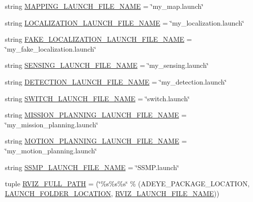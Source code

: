 \begin{DoxyCompactItemize}
\item 
string \hyperlink{namespacemanager_ad33e0681d727d6ce2212b3b1e8df8c58}{M\+A\+P\+P\+I\+N\+G\+\_\+\+L\+A\+U\+N\+C\+H\+\_\+\+F\+I\+L\+E\+\_\+\+N\+A\+ME} = \char`\"{}my\+\_\+map.\+launch\char`\"{}
\item 
string \hyperlink{namespacemanager_ac5cea2f52fdf5b97671e86476298f965}{L\+O\+C\+A\+L\+I\+Z\+A\+T\+I\+O\+N\+\_\+\+L\+A\+U\+N\+C\+H\+\_\+\+F\+I\+L\+E\+\_\+\+N\+A\+ME} = \char`\"{}my\+\_\+localization.\+launch\char`\"{}
\item 
string \hyperlink{namespacemanager_a4d3eb6177218a24979c6889f9c1908d2}{F\+A\+K\+E\+\_\+\+L\+O\+C\+A\+L\+I\+Z\+A\+T\+I\+O\+N\+\_\+\+L\+A\+U\+N\+C\+H\+\_\+\+F\+I\+L\+E\+\_\+\+N\+A\+ME} = \char`\"{}my\+\_\+fake\+\_\+localization.\+launch\char`\"{}
\item 
string \hyperlink{namespacemanager_a368d806bbf5be8e72604353b971871d5}{S\+E\+N\+S\+I\+N\+G\+\_\+\+L\+A\+U\+N\+C\+H\+\_\+\+F\+I\+L\+E\+\_\+\+N\+A\+ME} = \char`\"{}my\+\_\+sensing.\+launch\char`\"{}
\item 
string \hyperlink{namespacemanager_a1312c3fc2b915604378de82f841606b3}{D\+E\+T\+E\+C\+T\+I\+O\+N\+\_\+\+L\+A\+U\+N\+C\+H\+\_\+\+F\+I\+L\+E\+\_\+\+N\+A\+ME} = \char`\"{}my\+\_\+detection.\+launch\char`\"{}
\item 
string \hyperlink{namespacemanager_ac734eeabc7266313bdf84d100e8c5d77}{S\+W\+I\+T\+C\+H\+\_\+\+L\+A\+U\+N\+C\+H\+\_\+\+F\+I\+L\+E\+\_\+\+N\+A\+ME} = \char`\"{}switch.\+launch\char`\"{}
\item 
string \hyperlink{namespacemanager_ab7fc10389616b920dfa8634166a53e72}{M\+I\+S\+S\+I\+O\+N\+\_\+\+P\+L\+A\+N\+N\+I\+N\+G\+\_\+\+L\+A\+U\+N\+C\+H\+\_\+\+F\+I\+L\+E\+\_\+\+N\+A\+ME} = \char`\"{}my\+\_\+mission\+\_\+planning.\+launch\char`\"{}
\item 
string \hyperlink{namespacemanager_a60e86ba9ca513ac1fdda1ffd0d08c900}{M\+O\+T\+I\+O\+N\+\_\+\+P\+L\+A\+N\+N\+I\+N\+G\+\_\+\+L\+A\+U\+N\+C\+H\+\_\+\+F\+I\+L\+E\+\_\+\+N\+A\+ME} = \char`\"{}my\+\_\+motion\+\_\+planning.\+launch\char`\"{}
\item 
string \hyperlink{namespacemanager_a48b997992b3e5973e9ccfe2ce7869790}{S\+S\+M\+P\+\_\+\+L\+A\+U\+N\+C\+H\+\_\+\+F\+I\+L\+E\+\_\+\+N\+A\+ME} = \char`\"{}S\+S\+M\+P.\+launch\char`\"{}
\item 
tuple \hyperlink{namespacemanager_abec52dfb99cc7cf63fc7c9c112413570}{R\+V\+I\+Z\+\_\+\+F\+U\+L\+L\+\_\+\+P\+A\+TH} = (\char`\"{}\%s\%s\%s\char`\"{} \% (A\+D\+E\+Y\+E\+\_\+\+P\+A\+C\+K\+A\+G\+E\+\_\+\+L\+O\+C\+A\+T\+I\+ON, \hyperlink{namespacemanager_aade405cb0881d91b45085d7bc0f392fa}{L\+A\+U\+N\+C\+H\+\_\+\+F\+O\+L\+D\+E\+R\+\_\+\+L\+O\+C\+A\+T\+I\+ON}, \hyperlink{namespacemanager_af8103724e7745859a07a898ea00a8dd0}{R\+V\+I\+Z\+\_\+\+L\+A\+U\+N\+C\+H\+\_\+\+F\+I\+L\+E\+\_\+\+N\+A\+ME}))

\end{DoxyCompactItemize}
